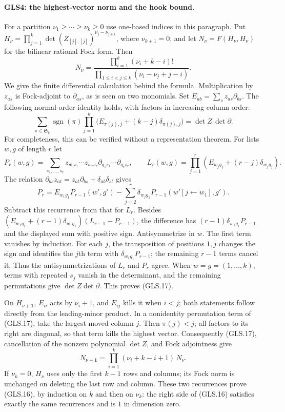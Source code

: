 \paragraph{GLS4: the highest-vector norm and the hook bound.}
\label{claim:GLS4}
For a partition $\nu_1\ge\cdots\ge\nu_k\ge0$ use one-based indices
in this paragraph.  Put
$H_\nu=\prod_{j=1}^k\det(Z_{[j],[j]})^{\nu_j-\nu_{j+1}}$,
where $\nu_{k+1}=0$, and let $N_\nu=F(H_\nu,H_\nu)$ for the
bilinear rational Fock form.  Then
\[
 N_\nu=
 \frac{\prod_{i=1}^k(\nu_i+k-i)!}
      {\prod_{1\le i<j\le k}(\nu_i-\nu_j+j-i)}.
 \tag{GLS.16}
\]
We give the finite differential calculation behind the formula.
Multiplication by $z_{as}$ is Fock-adjoint to $\partial_{as}$, as
is seen on two monomials.  Set $E_{ab}=\sum_s z_{as}\partial_{bs}$.
The following normal-order identity holds, with factors in increasing
column order:
\[
 \sum_{\pi\in\mathfrak S_k}\operatorname{sgn}(\pi)
 \prod_{j=1}^k\bigl(E_{\pi(j),j}+(k-j)\delta_{\pi(j),j}\bigr)
           =\det Z\,\det\partial.              \tag{GLS.17}
\]
For completeness, this can be verified without a representation
theorem.  For lists $w,g$ of length $r$ let
\[
 P_r(w,g)=\sum_{s_1,\ldots,s_r}
 z_{w_1s_1}\cdots z_{w_rs_r}
 \partial_{g_1s_1}\cdots\partial_{g_rs_r},\qquad
 L_r(w,g)=\prod_{j=1}^r
       (E_{w_jg_j}+(r-j)\delta_{w_jg_j}).
\]
The relation $\partial_{bs}z_{at}=z_{at}\partial_{bs}
+\delta_{ab}\delta_{st}$ gives
\[
 P_r=E_{w_1g_1}P_{r-1}(w',g')
   -\sum_{j=2}^r\delta_{w_jg_1}
                   P_{r-1}(w'[j\leftarrow w_1],g').
 \tag{GLS.18}
\]
Subtract this recurrence from that for $L_r$.  Besides
$(E_{w_1g_1}+(r-1)\delta_{w_1g_1})(L_{r-1}-P_{r-1})$, the
difference has $(r-1)\delta_{w_1g_1}P_{r-1}$ and the displayed
sum with positive sign.  Antisymmetrize in $w$.  The first term
vanishes by induction.  For each $j$, the transposition of positions
$1,j$ changes the sign and identifies the $j$th term with
$\delta_{w_1g_1}P_{r-1}$; the remaining $r-1$ terms cancel it.
Thus the antisymmetrizations of $L_r$ and $P_r$ agree.  When
$w=g=(1,\ldots,k)$, terms with repeated $s_j$ vanish in the
determinant, and the remaining permutations give
$\det Z\det\partial$.  This proves (GLS.17).

On $H_{\nu+\mathbf1}$, $E_{ii}$ acts by $\nu_i+1$, and
$E_{ij}$ kills it when $i<j$; both statements follow directly from
the leading-minor product.  In a nonidentity permutation term of
(GLS.17), take the largest moved column $j$.  Then $\pi(j)<j$;
all factors to its right are diagonal, so that term kills the
highest vector.  Consequently (GLS.17), cancellation of the nonzero
polynomial $\det Z$, and Fock adjointness give
\[
 N_{\nu+\mathbf1}
          =\prod_{i=1}^k(\nu_i+k-i+1)\,N_\nu.
 \tag{GLS.19}
\]
If $\nu_k=0$, $H_\nu$ uses only the first $k-1$ rows and columns;
its Fock norm is unchanged on deleting the last row and column.
These two recurrences prove (GLS.16), by induction on $k$ and then
on $\nu_k$: the right side of (GLS.16) satisfies exactly the same
recurrences and is $1$ in dimension zero.

